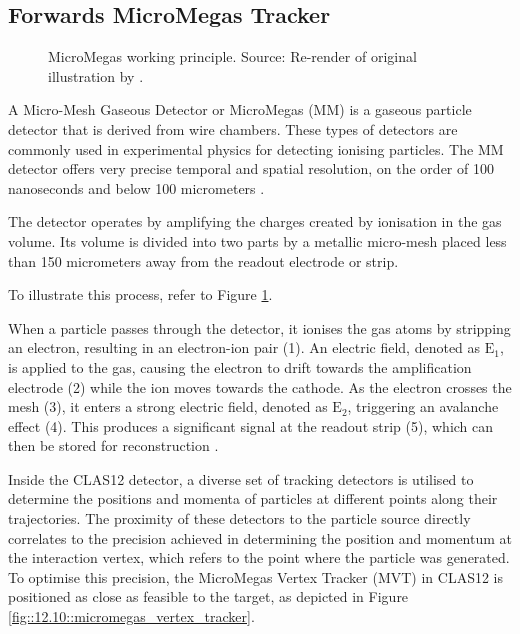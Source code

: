 \subsection{Forwards MicroMegas Tracker}
\label{12.10::forwards_micromegas_tracker}
    \begin{figure}[b!]
        \centering{}
        \caption[MM working principle.]{MicroMegas working principle.
        Source: Re-render of original illustration by \cite{giomataris1996}.}
        \label{fig::12.10::micromegas_principle}
    \end{figure}

    A Micro-Mesh Gaseous Detector or MicroMegas (MM) is a gaseous particle detector that is derived from wire chambers.
    These types of detectors are commonly used in experimental physics for detecting ionising particles.
    The MM detector offers very precise temporal and spatial resolution, on the order of 100 nanoseconds and below 100 micrometers \cite{giomataris1996}.

    The detector operates by amplifying the charges created by ionisation in the gas volume.
    Its volume is divided into two parts by a metallic micro-mesh placed less than 150 micrometers away from the readout electrode or strip.

    To illustrate this process, refer to Figure \ref{fig::12.10::micromegas_principle}.

    When a particle passes through the detector, it ionises the gas atoms by stripping an electron, resulting in an electron-ion pair (1).
    An electric field, denoted as $\text{E}_1$, is applied to the gas, causing the electron to drift towards the amplification electrode (2) while the ion moves towards the cathode.
    As the electron crosses the mesh (3), it enters a strong electric field, denoted as $\text{E}_2$, triggering an avalanche effect (4).
    This produces a significant signal at the readout strip (5), which can then be stored for reconstruction \cite{giomataris1996}.

    Inside the CLAS12 detector, a diverse set of tracking detectors is utilised to determine the positions and momenta of particles at different points along their trajectories.
    The proximity of these detectors to the particle source directly correlates to the precision achieved in determining the position and momentum at the interaction vertex, which refers to the point where the particle was generated.
    To optimise this precision, the MicroMegas Vertex Tracker (MVT) in CLAS12 is positioned as close as feasible to the target, as depicted in Figure \ref{fig::12.10::micromegas_vertex_tracker}.

